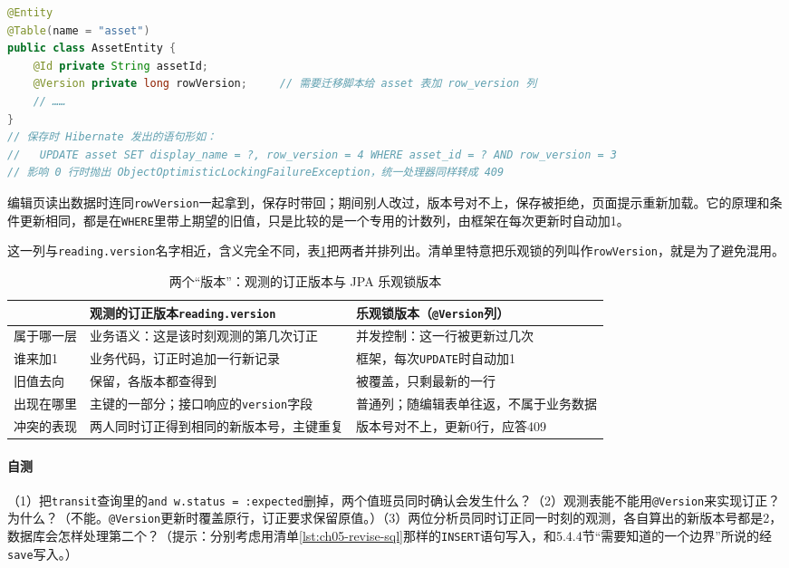 \begin{lstlisting}[label={lst:ch05-version-audit},language=Java,caption={@Version 乐观锁：需要给表加一列（书中示例）}]
@Entity
@Table(name = "asset")
public class AssetEntity {
    @Id private String assetId;
    @Version private long rowVersion;     // 需要迁移脚本给 asset 表加 row_version 列
    // ……
}
// 保存时 Hibernate 发出的语句形如：
//   UPDATE asset SET display_name = ?, row_version = 4 WHERE asset_id = ? AND row_version = 3
// 影响 0 行时抛出 ObjectOptimisticLockingFailureException，统一处理器同样转成 409
\end{lstlisting}

编辑页读出数据时连同\texttt{rowVersion}一起拿到，保存时带回；期间别人改过，版本号对不上，保存被拒绝，页面提示重新加载。它的原理和条件更新相同，都是在\texttt{WHERE}里带上期望的旧值，只是比较的是一个专用的计数列，由框架在每次更新时自动加1。

这一列与\texttt{reading.version}名字相近，含义完全不同，表\ref{tab:ch05-two-versions}把两者并排列出。清单里特意把乐观锁的列叫作\texttt{rowVersion}，就是为了避免混用。

\begin{table}[htbp]
\centering
\small
\caption{两个“版本”：观测的订正版本与 JPA 乐观锁版本}
\label{tab:ch05-two-versions}
\begin{tabular}{p{}p{}p{}}
\toprule
 & 观测的订正版本\texttt{reading.version} & 乐观锁版本（\texttt{@Version}列） \\
\midrule
属于哪一层 & 业务语义：这是该时刻观测的第几次订正 & 并发控制：这一行被更新过几次 \\
谁来加1 & 业务代码，订正时追加一行新记录 & 框架，每次\texttt{UPDATE}时自动加1 \\
旧值去向 & 保留，各版本都查得到 & 被覆盖，只剩最新的一行 \\
出现在哪里 & 主键的一部分；接口响应的\texttt{version}字段 & 普通列；随编辑表单往返，不属于业务数据 \\
冲突的表现 & 两人同时订正得到相同的新版本号，主键重复 & 版本号对不上，更新0行，应答409 \\
\bottomrule
\end{tabular}
\end{table}

\paragraph{自测}（1）把\texttt{transit}查询里的\texttt{and w.status = :expected}删掉，两个值班员同时确认会发生什么？（2）观测表能不能用\texttt{@Version}来实现订正？为什么？（不能。\texttt{@Version}更新时覆盖原行，订正要求保留原值。）（3）两位分析员同时订正同一时刻的观测，各自算出的新版本号都是2，数据库会怎样处理第二个？（提示：分别考虑用清单\ref{lst:ch05-revise-sql}那样的\texttt{INSERT}语句写入，和5.4.4节“需要知道的一个边界”所说的经\texttt{save}写入。）

